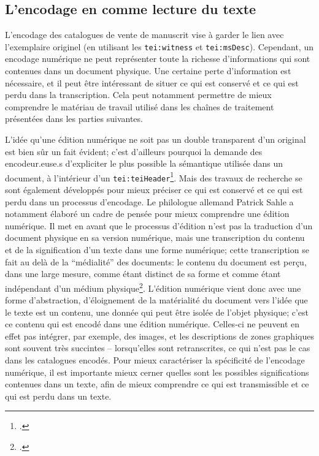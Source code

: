 \subsection{L'encodage en \tei{} comme lecture du texte}
L'encodage des catalogues de vente de manuscrit vise à garder le lien avec l'exemplaire originel (en utilisant les \texttt{tei:witness} et \texttt{tei:msDesc}). Cependant, un encodage numérique ne peut représenter toute la richesse d'informations qui sont contenues dans un document physique. Une certaine perte d'information est nécessaire, et il peut être intéressant de situer ce qui est conservé et ce qui est perdu dans la transcription. Cela peut notamment permettre de mieux comprendre le matériau de travail utilisé dans les chaînes de traitement présentées dans les parties suivantes.

L'idée qu'une édition numérique ne soit pas un double transparent d'un original est bien sûr un fait évident; c'est d'ailleurs pourquoi la \tei{} demande des encodeur.euse.s d'expliciter le plus possible la sémantique utilisée dans un document, à l'intérieur d'un \texttt{tei:teiHeader}\footcite[p. 104]{burnard_how_2019}. Mais des travaux de recherche se sont également développés pour mieux préciser ce qui est conservé et ce qui est perdu dans un processus d'encodage. Le philologue allemand Patrick Sahle a notamment élaboré un cadre de pensée pour mieux comprendre une édition numérique. Il met en avant que le processus d'édition n'est pas la traduction d'un document physique en sa version numérique, mais une transcription du contenu et de la signification d'un texte dans une forme numérique; cette transcription se fait au delà de la \enquote{médialité} des documents: le contenu du document est perçu, dans une large mesure, comme étant distinct de sa forme et comme étant indépendant d'un médium physique\footcite{sahle_digital_2016}. L'édition numérique vient donc avec une forme d'abstraction, d'éloignement de la matérialité du document vers l'idée que le texte est un contenu, une donnée qui peut être isolée de l'objet physique; c'est ce contenu qui est encodé dans une édition numérique. Celles-ci ne peuvent en effet pas intégrer, par exemple, des images, et les descriptions de zones graphiques sont souvent très succintes -- lorsqu'elles sont retranscrites, ce qui n'est pas le cas dans les catalogues encodés. Pour mieux caractériser la spécificité de l'encodage numérique, il est importante mieux cerner quelles sont les possibles significations contenues dans un texte, afin de mieux comprendre ce qui est transmissible et ce qui est perdu dans un texte. 

